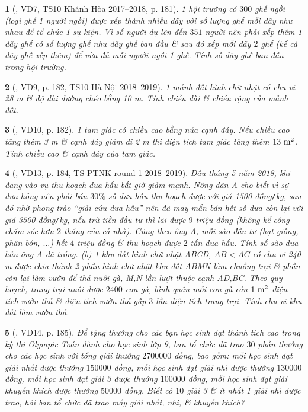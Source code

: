 \documentclass{article}
\newtheorem{baitoan}{}
\begin{document}
\begin{baitoan}[\cite{Thu_Viet_Minh_ptb2}, VD7, TS10 Khánh Hòa 2017--2018, p. 181]
	1 hội trường có $300$ ghế ngồi (loại ghế 1 người ngồi) được xếp thành nhiều dãy với số lượng ghế mỗi dãy như nhau để tổ chức 1 sự kiện. Vì số người dự lên đến $351$ người nên phải xếp thêm 1 dãy ghế có số lượng ghế như dãy ghế ban đầu \& sau đó xếp mỗi dãy $2$ ghế (kể cả dãy ghế xếp thêm) để vừa đủ mỗi người ngồi 1 ghế. Tính số dãy ghế ban đầu trong hội trường. 
\end{baitoan}

\begin{baitoan}[\cite{Thu_Viet_Minh_ptb2}, VD9, p. 182, TS10 Hà Nội 2018--2019]
	1 mảnh đất hình chữ nhật có chu vi {\rm28 m} \& độ dài đường chéo bằng {\rm10 m}. Tính chiều dài \& chiều rộng của mảnh đất.
\end{baitoan}

\begin{baitoan}[\cite{Thu_Viet_Minh_ptb2}, VD10, p. 182]
	1 tam giác có chiều cao bằng nửa cạnh đáy. Nếu chiều cao tăng thêm {\rm3 m} \& cạnh đáy giảm đi {\rm2 m} thì diện tích tam giác tăng thêm $\rm13\ m^2$. Tính chiều cao \& cạnh đáy của tam giác.
\end{baitoan}

\begin{baitoan}[\cite{Thu_Viet_Minh_ptb2}, VD13, p. 184, TS PTNK round 1 2018--2019]
	Đầu tháng 5 năm 2018, khi đang vào vụ thu hoạch dưa hấu bất giờ giảm mạnh. Nông dân A cho biết vì sợ dưa hỏng nên phải bán $30\%$ số dưa hấu thu hoạch được với giá {\rm1500 đồng{\tt/}kg}, sau đó nhờ phong trào ``giải cứu dưa hấu'' nên đã may mắn bán hết số dưa còn lại với giá {\rm3500 đồng{\tt/}kg}, nếu trừ tiền đầu tư thì lãi được $9$ triệu đồng (không kể công chăm sóc hơn $2$ tháng của cả nhà). Cũng theo ông A, mỗi sào đầu tư (hạt giống, phân bón, $\ldots$) hết $4$ triệu đồng \& thu hoạch được $2$ tấn dưa hấu. Tính số sào dưa hấu ông A đã trồng. (b) 1 khu đất hình chữ nhật ABCD, $AB < AC$ có chu vi {\rm240 m} được chia thành 2 phần hình chữ nhật khu đất ABMN làm chuồng trại \& phần còn lại làm vườn để thả nuôi gà, M,N lần lượt thuộc cạnh AD,BC. Theo quy hoạch, trang trại nuôi được $2400$ con gà, bình quân mỗi con gà cần $\rm1\ m^2$ diện tích vườn thả \& diện tích vườn thả gấp $3$ lần diện tích trang trại. Tính chu vi khu đất làm vườn thả.
\end{baitoan}

\begin{baitoan}[\cite{Thu_Viet_Minh_ptb2}, VD14, p. 185]
	Để tặng thưởng cho các bạn học sinh đạt thành tích cao trong kỳ thi Olympic Toán dành cho học sinh lớp 9, ban tổ chức đã trao $30$ phần thưởng cho các học sinh với tổng giải thưởng $2700000$ đồng, bao gồm: mỗi học sinh đạt giải nhất được thưởng $150000$ đồng, mỗi học sinh đạt giải nhì được thưởng $130000$ đồng, mỗi học sinh đạt giải 3 được thưởng $100000$ đồng, mỗi học sinh đạt giải khuyến khích được thưởng $50000$ đồng. Biết có $10$ giải 3 \& ít nhất 1 giải nhì được trao, hỏi ban tổ chức đã trao mấy giải nhất, nhì, \& khuyến khích?
\end{baitoan}
\end{document}
